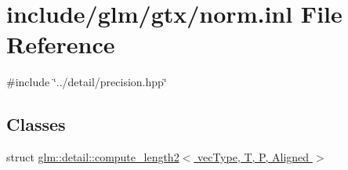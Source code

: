 \hypertarget{norm_8inl}{}\section{include/glm/gtx/norm.inl File Reference}
\label{norm_8inl}
{\ttfamily \#include \char`\"{}../detail/precision.\+hpp\char`\"{}}\newline
\subsection*{Classes}
\begin{DoxyCompactItemize}
\item 
struct \hyperlink{structglm_1_1detail_1_1compute__length2}{glm\+::detail\+::compute\+\_\+length2$<$ vec\+Type, T, P, Aligned $>$}
\end{DoxyCompactItemize}
